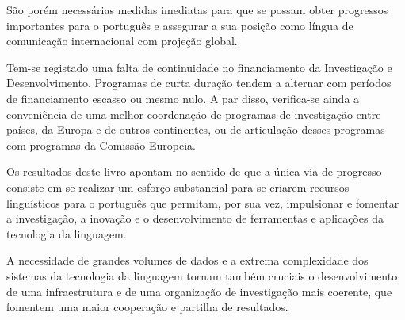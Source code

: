 \begin{multicols}{2}
São porém necessárias medidas imediatas para que se possam obter progressos importantes
para o português e assegurar a sua posição como língua de comunicação internacional com projeção global.



Tem-se registado uma falta de continuidade no financiamento da Investigação e Desenvolvimento. 
Programas de curta duração tendem a alternar com períodos de financiamento escasso ou mesmo nulo.
A par disso, verifica-se ainda a conveniência de uma melhor coordenação de programas de investigação
entre países, da Europa e de outros continentes, ou de articulação desses programas com programas 
da Comissão Europeia.

Os resultados deste livro apontam no sentido de que a única via de progresso consiste em se realizar um esforço substancial 
para se criarem recursos linguísticos para o português que permitam, por sua vez, impulsionar 
e fomentar a investigação, a inovação e o desenvolvimento de ferramentas e aplicações da tecnologia da linguagem. 

A necessidade de grandes volumes de dados e a extrema complexidade dos sistemas da tecnologia da linguagem tornam também cruciais o desenvolvimento de uma infraestrutura e de uma organização de investigação mais coerente, que fomentem uma maior cooperação e partilha de resultados.



\end{multicols}

\cleardoublepage



